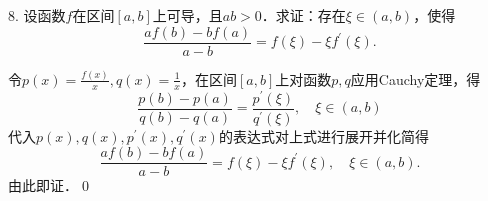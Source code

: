8. 设函数$f$在区间$[a,b]$上可导，且$ab>0$．求证：存在$\xi \in (a,b)$，使得
\begin{equation*}
    \frac{af(b)-bf(a)}{a-b} = f(\xi) - \xi f^{\prime}(\xi).
\end{equation*}

\prove 令$p(x) = \displaystyle\frac{f(x)}{x}, q(x) = \frac{1}{x}$，在区间$[a,b]$上对函数$p,q$应用Cauchy定理，得
\begin{equation}
    \frac{p(b)-p(a)}{q(b)-q(a)} = \frac{p^{\prime}(\xi)}{q^{\prime}(\xi)}, \quad \xi \in (a,b)
\end{equation}
代入$p(x),q(x),p^\prime (x), q^\prime (x)$的表达式对上式进行展开并化简得
\begin{equation}
    \frac{af(b)-bf(a)}{a-b} = f(\xi) - \xi f^{\prime}(\xi), \quad \xi \in (a,b).
\end{equation}
由此即证．\qed\bigskip